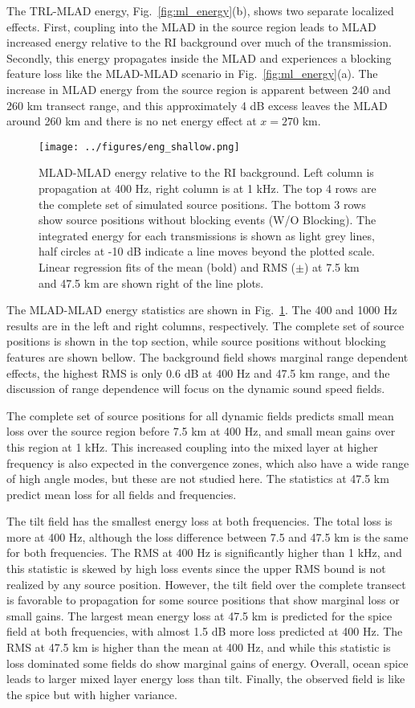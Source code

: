 \documentclass[preprint,NumberedRefs]{JASA}
\begin{document}
The TRL-MLAD energy, Fig.~\ref{fig:ml_energy}(b), shows two separate localized effects. First, coupling into the MLAD in the source region leads to MLAD increased energy relative to the RI background over much of the transmission. Secondly, this energy propagates inside the MLAD and experiences a blocking feature loss like the MLAD-MLAD scenario in Fig.~\ref{fig:ml_energy}(a). The increase in MLAD energy from the source region is apparent between 240 and 260 km transect range, and this approximately 4 dB excess leaves the MLAD around 260 km and there is no net energy effect at $x=270$ km.

\begin{figure}
\texttt{[image: ../figures/eng\_shallow.png]}
    \caption{MLAD-MLAD energy relative to the RI background. Left column is propagation at 400 Hz, right column is at 1 kHz. The top 4 rows are the complete set of simulated source positions. The bottom 3 rows show source positions without blocking events (W/O Blocking). The integrated energy for each transmissions is shown as light grey lines, half circles at -10 dB indicate a line moves beyond the plotted scale. Linear regression fits of the mean (bold) and RMS ($\pm$) at 7.5 km and 47.5 km are shown right of the line plots.}
    \label{fig:shal_eng}
\end{figure}
The MLAD-MLAD energy statistics are shown in Fig.~\ref{fig:shal_eng}. The 400 and 1000 Hz results are in the left and right columns, respectively. The complete set of source positions is shown in the top section, while source positions without blocking features are shown bellow. The background field shows marginal range dependent effects, the highest RMS is only 0.6 dB at 400 Hz and 47.5 km range, and the discussion of range dependence will focus on the dynamic sound speed fields.

The complete set of source positions for all dynamic fields predicts small mean loss over the source region before 7.5 km at 400 Hz, and small mean gains over this region at 1 kHz. This increased coupling into the mixed layer at higher frequency is also expected in the convergence zones, which also have a wide range of high angle modes, but these are not studied here. The statistics at 47.5 km predict mean loss for all fields and frequencies.

The tilt field has the smallest energy loss at both frequencies. The total loss is more at 400 Hz, although the loss difference between 7.5 and 47.5 km is the same for both frequencies. The RMS at 400 Hz is significantly higher than 1 kHz, and this statistic is skewed by high loss events since the upper RMS bound is not realized by any source position. However, the tilt field over the complete transect is favorable to propagation for some source positions that show marginal loss or small gains. The largest mean energy loss at 47.5 km is predicted for the spice field at both frequencies, with almost 1.5 dB more loss predicted at 400 Hz. The RMS at 47.5 km is higher than the mean at 400 Hz, and while this statistic is loss dominated some fields do show marginal gains of energy. Overall, ocean spice leads to larger mixed layer energy loss than tilt. Finally, the observed field is like the spice but with higher variance.
\end{document}
